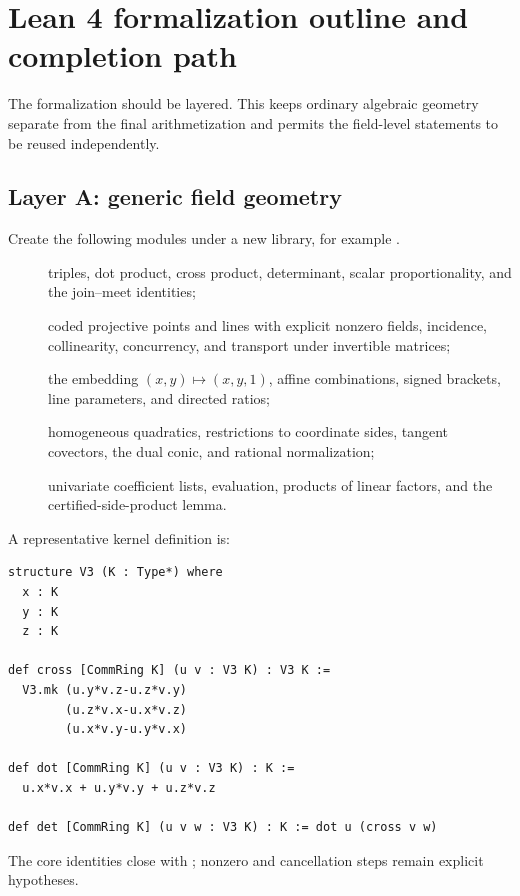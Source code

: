 \section{Lean 4 formalization outline and completion path}

The formalization should be layered.  This keeps ordinary algebraic geometry
separate from the final arithmetization and permits the field-level statements
to be reused independently.

\subsection{Layer A: generic field geometry}

Create the following modules under a new library, for example
.
\begin{description}
\item[] triples, dot product, cross product, determinant,
  scalar proportionality, and the join--meet identities;
\item[] coded projective points and lines with explicit
  nonzero fields, incidence, collinearity, concurrency, and transport under
  invertible matrices;
\item[] the embedding $(x,y)\mapsto(x,y,1)$, affine
  combinations, signed brackets, line parameters, and directed ratios;
\item[] homogeneous quadratics, restrictions to coordinate
  sides, tangent covectors, the dual conic, and rational normalization;
\item[] univariate coefficient lists, evaluation,
  products of linear factors, and the certified-side-product lemma.
\end{description}

A representative kernel definition is:
\begin{lstlisting}[language={},caption={Suggested field-level kernel}]
structure V3 (K : Type*) where
  x : K
  y : K
  z : K

def cross [CommRing K] (u v : V3 K) : V3 K :=
  V3.mk (u.y*v.z-u.z*v.y)
        (u.z*v.x-u.x*v.z)
        (u.x*v.y-u.y*v.x)

def dot [CommRing K] (u v : V3 K) : K :=
  u.x*v.x + u.y*v.y + u.z*v.z

def det [CommRing K] (u v w : V3 K) : K := dot u (cross v w)
\end{lstlisting}
The core identities close with ; nonzero and cancellation steps
remain explicit hypotheses.

